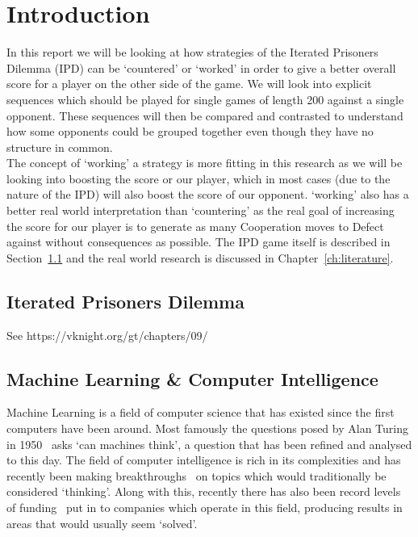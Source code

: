 
\chapter{Introduction}\label{ch:intro}
In this report we will be looking at how strategies of the Iterated Prisoners Dilemma (IPD) can be `countered' or `worked' in order to give a better overall score for a player on the other side of the game.
We will look into explicit sequences which should be played for single games of length 200 against a single opponent.
These sequences will then be compared and contrasted to understand how some opponents could be grouped together even though they have no structure in common.\\

The concept of `working' a strategy is more fitting in this research as we will be looking into boosting the score or our player, which in most cases (due to the nature of the IPD) will also boost the score of our opponent.
`working' also has a better real world interpretation than `countering' as the real goal of increasing the score for our player is to generate as many Cooperation moves to Defect against without consequences as possible.
The IPD game itself is described in Section~\ref{sec:iteratedPrisonersDilemma} and the real world research is discussed in Chapter~\ref{ch:literature}. 

\section{Iterated Prisoners Dilemma}\label{sec:iteratedPrisonersDilemma}

See https://vknight.org/gt/chapters/09/

\section{Machine Learning \& Computer Intelligence}\label{sec:machineLearningAndcomputerIntelligence}
Machine Learning is a field of computer science that has existed since the first computers have been around.
Most famously the questions posed by Alan Turing in 1950~\cite{turing1950computing} asks `can machines think', a question that has been refined and analysed to this day.
The field of computer intelligence is rich in its complexities and has recently been making breakthroughs~\cite{knight2017alphaZeroMIT} on topics which would traditionally be considered `thinking'.
Along with this, recently there has also been record levels of funding~\cite{chui2017artificial} put in to companies which operate in this field, producing results in areas that would usually seem `solved'.\\

